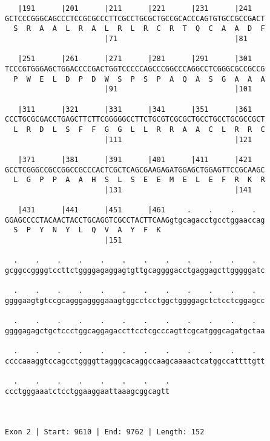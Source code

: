 \documentclass{article}
\begin{document}
\begin{Verbatim}
   |191      |201      |211      |221      |231      |241   
GCTCCCGGGCAGCCCTCCGCGCCCTTCGCCTGCGCTGCCGCACCCAGTGTGCCGCCGACT
  S  R  A  A  L  R  A  L  R  L  R  C  R  T  Q  C  A  A  D  F
                       |71                           |81    
  
   |251      |261      |271      |281      |291      |301   
TCCCGTGGGAGCTGGACCCCGACTGGTCCCCCAGCCCGGCCCAGGCCTCGGGCGCCGCCG
  P  W  E  L  D  P  D  W  S  P  S  P  A  Q  A  S  G  A  A  A
                       |91                           |101   
  
   |311      |321      |331      |341      |351      |361   
CCCTGCGCGACCTGAGCTTCTTCGGGGGCCTTCTGCGTCGCGCTGCCTGCCTGCGCCGCT
  L  R  D  L  S  F  F  G  G  L  L  R  R  A  A  C  L  R  R  C
                       |111                          |121   
  
   |371      |381      |391      |401      |411      |421   
GCCTCGGGCCGCCGGCCGCCCACTCGCTCAGCGAAGAGATGGAGCTGGAGTTCCGCAAGC
  L  G  P  P  A  A  H  S  L  S  E  E  M  E  L  E  F  R  K  R
                       |131                          |141   
  
   |431      |441      |451      |461     .    .    .    .  
GGAGCCCCTACAACTACCTGCAGGTCGCCTACTTCAAGgtgcagacctgcctggaaccag
  S  P  Y  N  Y  L  Q  V  A  Y  F  K                        
                       |151                                 
  
  .    .    .    .    .    .    .    .    .    .    .    .  
gcggccggggtccttctggggagaggagtgttgcaggggacctgaggagcttgggggatc
                                                            
  .    .    .    .    .    .    .    .    .    .    .    .  
ggggaagtgtccgcagggaggggaaagtggcctcctggctggggagctctcctcggagcc
                                                            
  .    .    .    .    .    .    .    .    .    .    .    .  
ggggagagctgctccctggcaggagaccttcctcgcccagttcgcatgggcagatgctaa
                                                            
  .    .    .    .    .    .    .    .    .    .    .    .  
ccccaaaggtccagcctggggttagggcacaggccaagcaaaactcatggccattttgtt
                                                            
  .    .    .    .    .    .    .    .
ccctgggaaatctcctggaaggaattaaagcggcagtt
                                      
                                      
 
Exon 2 | Start: 9610 | End: 9762 | Length: 152




\end{Verbatim}
\end{document}
